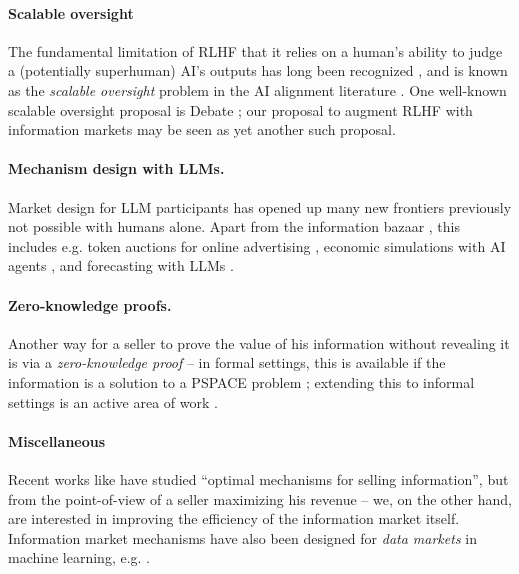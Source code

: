 \paragraph{Scalable oversight} The fundamental limitation of RLHF that it relies on a human's ability to judge a (potentially superhuman) AI's outputs has long been recognized , and is known as the \emph{scalable oversight} problem in the AI alignment literature . One well-known scalable oversight proposal is Debate ; our proposal to augment RLHF with information markets may be seen as yet another such proposal.

\paragraph{Mechanism design with LLMs.} Market design for LLM participants has opened up many new frontiers previously not possible with humans alone. Apart from the information bazaar , this includes e.g. token auctions for online advertising , economic simulations with AI agents , and forecasting with LLMs .

\paragraph{Zero-knowledge proofs.} Another way for a seller to prove the value of his information without revealing it is via a \emph{zero-knowledge proof}  -- in formal settings, this is available if the information is a solution to a PSPACE problem ; extending this to informal settings is an active area of work .

\paragraph{Miscellaneous} Recent works like  have studied ``optimal mechanisms for selling information'', but from the point-of-view of a seller maximizing his revenue -- we, on the other hand, are interested in improving the efficiency of the information market itself. Information market mechanisms have also been designed for \emph{data markets} in machine learning, e.g. .


